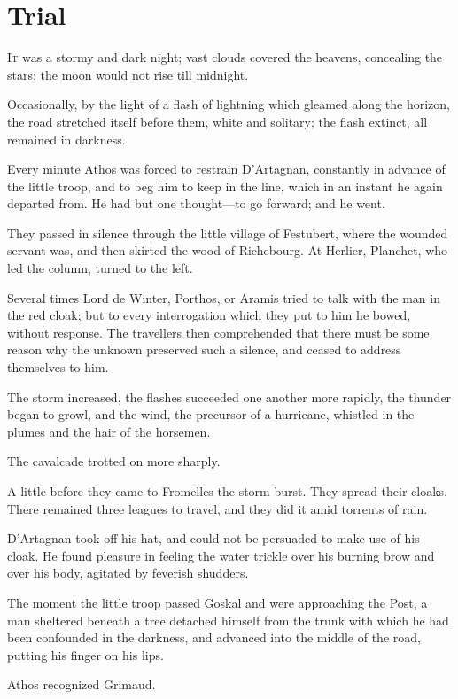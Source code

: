 
\chapter{Trial}

\lettrine{I}{t} was a stormy and dark night; vast clouds covered the heavens, concealing the stars; the moon would not rise till midnight. 

\zz
Occasionally, by the light of a flash of lightning which gleamed along the horizon, the road stretched itself before them, white and solitary; the flash extinct, all remained in darkness. 

Every minute Athos was forced to restrain D'Artagnan, constantly in advance of the little troop, and to beg him to keep in the line, which in an instant he again departed from. He had but one thought—to go forward; and he went. 

They passed in silence through the little village of Festubert, where the wounded servant was, and then skirted the wood of Richebourg. At Herlier, Planchet, who led the column, turned to the left. 

Several times Lord de Winter, Porthos, or Aramis tried to talk with the man in the red cloak; but to every interrogation which they put to him he bowed, without response. The travellers then comprehended that there must be some reason why the unknown preserved such a silence, and ceased to address themselves to him. 

The storm increased, the flashes succeeded one another more rapidly, the thunder began to growl, and the wind, the precursor of a hurricane, whistled in the plumes and the hair of the horsemen. 

The cavalcade trotted on more sharply. 

A little before they came to Fromelles the storm burst. They spread their cloaks. There remained three leagues to travel, and they did it amid torrents of rain. 

D'Artagnan took off his hat, and could not be persuaded to make use of his cloak. He found pleasure in feeling the water trickle over his burning brow and over his body, agitated by feverish shudders. 

The moment the little troop passed Goskal and were approaching the Post, a man sheltered beneath a tree detached himself from the trunk with which he had been confounded in the darkness, and advanced into the middle of the road, putting his finger on his lips. 

Athos recognized Grimaud. 

